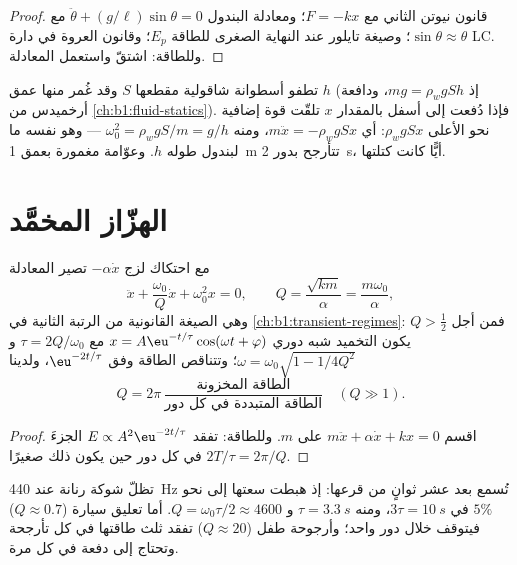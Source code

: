\begin{proof}
قانون نيوتن الثاني مع $F = -kx$؛ ومعادلة البندول
$\ddot\theta + (g/\ell)\sin\theta = 0$ مع $\sin\theta \approx \theta$؛
وصيغة تايلور عند النهاية الصغرى للطاقة $E_p$؛ وقانون العروة في دارة
LC. وللطاقة: اشتقّ واستعمل المعادلة.
\end{proof}

\begin{example}\label{ex:b1:oscillators-resonance:bob}
تطفو أسطوانة شاقولية مقطعها $S$ وقد غُمر منها عمق $h$
(إذ $mg = \rho_wgSh$، ودافعة أرخميدس من \cref{ch:b1:fluid-statics}).
فإذا دُفعت إلى أسفل بالمقدار $x$ تلقّت قوة إضافية نحو الأعلى $\rho_wgSx$:
أي $m\ddot x = -\rho_wgSx$، ومنه $\omega_0^2 = \rho_wgS/m = g/h$ --- وهو نفسه
ما لبندول طوله $h$. وعوّامة مغمورة بعمق \qty{1}{m} تتأرجح بدور
\qty{2}{s}، أيًّا كانت كتلتها.
\end{example}

\section{الهزّاز المخمَّد}

\begin{proposition}\label{prop:b1:oscillators-resonance:damped}
مع احتكاك لزج $-\alpha\dot x$ تصير المعادلة
\[
\ddot x + \frac{\omega_0}{Q}\dot x + \omega_0^2x = 0, \qquad
Q = \frac{\sqrt{km}}{\alpha} = \frac{m\omega_0}{\alpha},
\]
وهي الصيغة القانونية من الرتبة الثانية في \cref{ch:b1:transient-regimes}: فمن أجل
$Q > \tfrac12$ يكون التخميد شبه دوري $x = A\eu^{-t/\tau}\cos(\omega t +
\varphi)$ مع $\tau = 2Q/\omega_0$ و $\omega = \omega_0\sqrt{1 - 1/4Q^2}$؛ وتتناقص
الطاقة وفق $\eu^{-2t/\tau}$، ولدينا
\[
Q = 2\pi\,\frac{\text{الطاقة المخزونة}}{\text{الطاقة المتبددة في كل دور}}
\quad (Q \gg 1) .
\]
\end{proposition}

\begin{proof}
اقسم $m\ddot x + \alpha\dot x + kx = 0$ على $m$. وللطاقة: تفقد $E
\propto A^2\eu^{-2t/\tau}$ الجزءَ $2T/\tau = 2\pi/Q$ في كل
دور حين يكون ذلك صغيرًا.
\end{proof}

\begin{example}\label{ex:b1:oscillators-resonance:ringing}
تظلّ شوكة رنانة عند \qty{440}{Hz} تُسمع بعد عشر ثوانٍ من
قرعها: إذ هبطت سعتها إلى نحو $5\%$ في $3\tau = \qty{10}{s}$، ومنه
$\tau = \qty{3.3}{s}$ و $Q = \omega_0\tau/2 \approx 4600$. أما تعليق
سيارة ($Q \approx 0.7$) فيتوقف خلال دور واحد؛ وأرجوحة طفل
($Q \approx 20$) تفقد ثلث طاقتها في كل تأرجحة وتحتاج إلى دفعة
في كل مرة.
\end{example}

